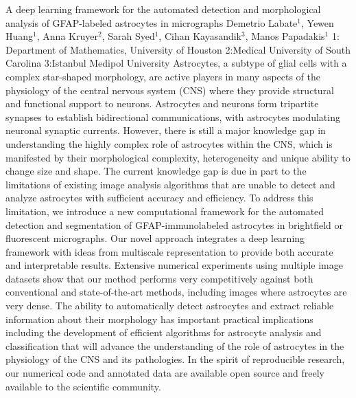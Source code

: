 \begin{addmargin}[2em]{0em}
\vspace{1.5ex}
\abs
{A deep learning framework for the automated detection and morphological analysis of GFAP-labeled astrocytes in micrographs}
{Demetrio Labate$^{1}$, Yewen Huang$^{1}$, Anna Kruyer$^{2}$, Sarah Syed$^{1}$, Cihan Kayasandik$^{3}$, Manos Papadakis$^{1}$}
{1: Department of Mathematics, University of Houston 2:Medical University of South Carolina 3:Istanbul Medipol University}
{Astrocytes, a subtype of glial cells with a complex star-shaped morphology, are active players in many aspects of the physiology of the central nervous system (CNS) where they provide structural and functional support to neurons. Astrocytes and neurons form tripartite synapses to establish bidirectional communications, with astrocytes modulating neuronal synaptic currents. However, there is still a major knowledge gap in understanding the highly complex role of astrocytes within the CNS, which is manifested by their morphological complexity, heterogeneity and unique ability to change size and shape. The current knowledge gap is due in part to the limitations of existing image analysis algorithms that are unable to detect and analyze astrocytes with sufficient accuracy and efficiency.  To address this limitation, we introduce a new computational framework for the automated detection and segmentation of GFAP-immunolabeled astrocytes in brightfield or fluorescent micrographs. Our novel approach integrates a deep learning framework with ideas from multiscale representation to provide both accurate and interpretable results. Extensive numerical experiments using multiple image datasets show that our method performs very competitively against both conventional and state-of-the-art methods, including images where astrocytes are very dense. The ability to automatically detect astrocytes and extract reliable information about their morphology has important practical implications including the development of efficient algorithms for astrocyte analysis and classification that will advance the understanding of the role of astrocytes in the physiology of the CNS and its pathologies.  In the spirit of reproducible research, our numerical code and annotated data are available open source and freely available to the scientific community.}



\end{addmargin}
